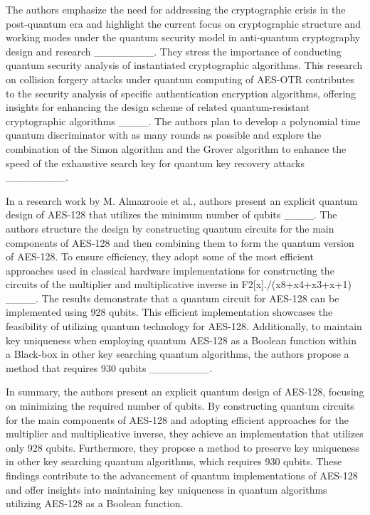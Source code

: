 The authors emphasize the need for addressing the cryptographic crisis in the post-quantum era and highlight the current focus on cryptographic structure and working modes under the quantum security model in anti-quantum cryptography design and research ________. They stress the importance of conducting quantum security analysis of instantiated cryptographic algorithms. This research on collision forgery attacks under quantum computing of AES-OTR contributes to the security analysis of specific authentication encryption algorithms, offering insights for enhancing the design scheme of related quantum-resistant cryptographic algorithms ____. The authors plan to develop a polynomial time quantum discriminator with as many rounds as possible and explore the combination of the Simon algorithm and the Grover algorithm to enhance the speed of the exhaustive search key for quantum key recovery attacks ________. 
 

In a research work by M. Almazrooie et al., authors present an explicit quantum design of AES-128 that utilizes the minimum number of qubits ____. The authors structure the design by constructing quantum circuits for the main components of AES-128 and then combining them to form the quantum version of AES-128. To ensure efficiency, they adopt some of the most efficient approaches used in classical hardware implementations for constructing the circuits of the multiplier and multiplicative inverse in F2[x]./(x8+x4+x3+x+1) ____. The results demonstrate that a quantum circuit for AES-128 can be implemented using 928 qubits. This efficient implementation showcases the feasibility of utilizing quantum technology for AES-128. Additionally, to maintain key uniqueness when employing quantum AES-128 as a Boolean function within a Black-box in other key searching quantum algorithms, the authors propose a method that requires 930 qubits ________.
 

In summary, the authors present an explicit quantum design of AES-128, focusing on minimizing the required number of qubits. By constructing quantum circuits for the main components of AES-128 and adopting efficient approaches for the multiplier and multiplicative inverse, they achieve an implementation that utilizes only 928 qubits. Furthermore, they propose a method to preserve key uniqueness in other key searching quantum algorithms, which requires 930 qubits. These findings contribute to the advancement of quantum implementations of AES-128 and offer insights into maintaining key uniqueness in quantum algorithms utilizing AES-128 as a Boolean function. 


